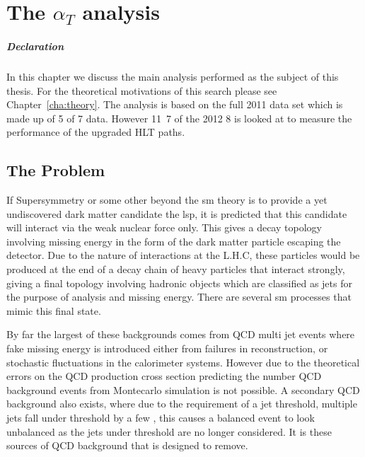 \chapter{The $\alpha_{T}$ analysis} %
\label{cha:the_t_analysis}
\paragraph{Declaration} %
\label{par:declaration-alphat}


In this chapter we discuss the main analysis performed as the subject of this 
thesis. For the theoretical motivations of this search please see 
Chapter~\ref{cha:theory}. The analysis is based on the full 2011 data set which is made up of \unit{5}{\invfb} of \unit{7}{\TeV} data. However \unit{11.7}{\invfb} of the 2012 \unit{8}{\TeV} is looked at to measure the performance of the upgraded \alt HLT paths.
\section{The Problem} %
\label{sec:the_problem}
If Supersymmetry or some other beyond the \ac{sm} theory is to provide a 
yet undiscovered dark matter candidate the \ac{lsp}, it is predicted that this 
candidate will interact via the weak nuclear force only. This gives a decay 
topology involving missing energy in the form of the dark matter particle 
escaping the detector. Due to the nature of interactions at the L.H.C, these 
particles would be produced at the end of a decay chain of heavy particles that 
interact strongly, giving a final topology involving hadronic objects which are 
classified as jets for the purpose of analysis and missing energy.
There are several \ac{sm} processes that mimic this final state.

By far the largest of these backgrounds comes from QCD multi jet events where 
fake missing energy is introduced either from failures in reconstruction, or 
stochastic fluctuations in the calorimeter systems.
However due to the theoretical errors on the QCD production cross section 
predicting the number QCD background events from Montecarlo simulation is not 
possible.
A secondary QCD background also exists, where due to the requirement of a jet 
\ET threshold, multiple jets fall under threshold by a few \GeV, this causes a 
balanced event to look unbalanced as the jets under threshold are no longer 
considered. It is these sources of QCD background that \alt is designed to remove.


